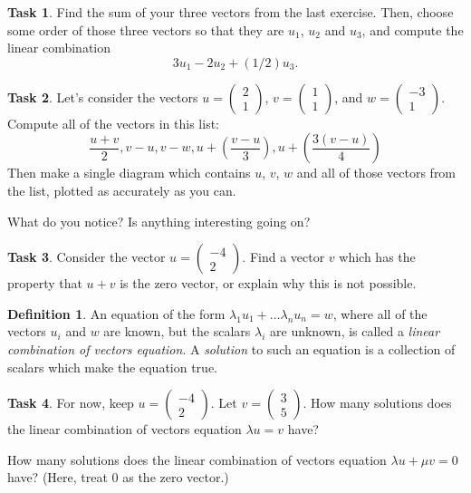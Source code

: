 \documentclass{tufte-book}
\theoremstyle{definition}
\newtheorem{task}{Task}
\newtheorem*{definition}{Definition}
\begin{document}
\begin{task}
Find the sum of your three vectors from the last exercise. Then, choose some order of those three vectors so that they are $u_1$, $u_2$ and $u_3$, and compute the linear combination
\[
3u_1 - 2u_2 + (1/2)u_3.
\] 
\end{task}

\begin{task}
Let's consider the vectors $u=\left(\begin{smallmatrix} 2 \\1 \end{smallmatrix}\right)$, 
$v=\left(\begin{smallmatrix} 1\\ 1 \end{smallmatrix}\right)$, and $w=\left(\begin{smallmatrix} -3\\ 1 \end{smallmatrix}\right)$.
Compute all of the vectors in this list:
\[
\dfrac{u+v}{2}, v-u, v-w, u + \left(\dfrac{v-u}{3}\right), u + \left(\dfrac{3(v-u)}{4}\right)
\]
Then make a single diagram which contains $u$, $v$, $w$ and all of those vectors from the list, plotted as accurately as you can.

What do you notice? Is anything interesting going on?
\end{task}

\begin{task}
Consider the vector $u = \left(\begin{smallmatrix} -4 \\ 2\end{smallmatrix}\right)$. Find a vector $v$ which has the property that $u+v$ is the zero vector, or explain why this is not possible.
\end{task}

\begin{definition}
An equation of the form $\lambda_1 u_1 + \dots \lambda_n u_n = w$, where all of the vectors $u_i$ and $w$ are known, but the scalars $\lambda_i$ are unknown, is called a \emph{linear combination of vectors equation}.
A \emph{solution} to such an equation is 
a collection of scalars which make the equation true.
\end{definition}

\begin{task}
For now, keep $u = \left(\begin{smallmatrix} -4 \\ 2\end{smallmatrix}\right)$. 
Let $v = \left(\begin{smallmatrix} 3 \\ 5 \end{smallmatrix}\right)$.
How many solutions does the linear combination of vectors equation
$\lambda u = v$
have?

How many solutions does the linear combination of vectors equation 
$\lambda u + \mu v = 0$
have? (Here, treat $0$ as the zero vector.)
\end{task}
\end{document}

